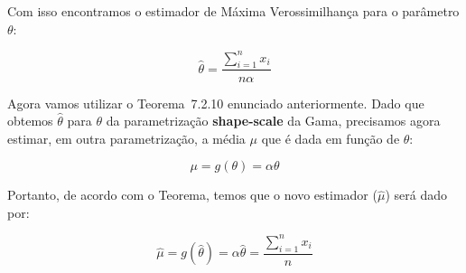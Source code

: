Com isso encontramos o estimador de Máxima Verossimilhança para o parâmetro $\theta$:

\begin{equation}
 \widehat{\theta} = \frac{\sum_{i=1}^{n}x_i}{n\alpha} 
\end{equation}

Agora vamos utilizar o Teorema~7.2.10 enunciado anteriormente. Dado que obtemos $\widehat{\theta}$ para $\theta$ da parametrização \textbf{shape-scale} da Gama, precisamos agora estimar, em outra parametrização, a média $\mu$ que é dada em função de $\theta$:

\begin{equation}
\mu = g(\theta) = \alpha\theta
\end{equation}

Portanto, de acordo com o Teorema, temos que o novo estimador ($\widehat{\mu}$) será dado por:

\begin{equation}
\widehat{\mu} = g(\widehat{\theta}) = \alpha\widehat{\theta}=  \frac{\sum_{i=1}^{n}x_i}{n}
\end{equation}






